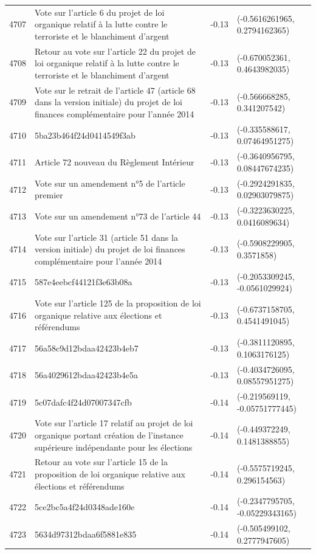 \begin{table}[ht]
\begin{tabular}{rlrl}
  4707 & Vote sur l'article 6 du projet de loi organique relatif à la lutte contre le terroriste et le blanchiment d'argent & -0.13 & (-0.5616261965, 0.2794162365) \\ 
  4708 & Retour au vote sur l'article 22 du projet de loi organique relatif à la lutte contre le terroriste et le blanchiment d'argent & -0.13 & (-0.670052361, 0.4643982035) \\ 
  4709 & Vote sur le retrait de l'article 47 (article 68 dans la version initiale) du projet de loi finances complémentaire pour l'année 2014 & -0.13 & (-0.566668285, 0.341207542) \\ 
  4710 & 5ba23b464f24d0414549f3ab & -0.13 & (-0.335588617, 0.07464951275) \\ 
  4711 & Article 72 nouveau du Règlement Intérieur & -0.13 & (-0.3640956795, 0.08447674235) \\ 
  4712 & Vote sur un amendement n°5 de l'article premier & -0.13 & (-0.2924291835, 0.02903079875) \\ 
  4713 & Vote sur un amendement n°73 de l'article 44 & -0.13 & (-0.3223630225, 0.0416089634) \\ 
  4714 & Vote sur l'article 31 (article 51 dans la version initiale) du projet de loi finances complémentaire pour l'année 2014 & -0.13 & (-0.5908229905, 0.3571858) \\ 
  4715 & 587e4eebcf44121f3e63b08a & -0.13 & (-0.2053309245, -0.0561029924) \\ 
  4716 & Vote sur l'article 125 de la proposition de loi organique relative aux élections et référendums & -0.13 & (-0.6737158705, 0.4541491045) \\ 
  4717 & 56a58c9d12bdaa42423b4eb7 & -0.13 & (-0.3811120895, 0.1063176125) \\ 
  4718 & 56a4029612bdaa42423b4e5a & -0.13 & (-0.4034726095, 0.08557951275) \\ 
  4719 & 5c07dafc4f24d07007347cfb & -0.14 & (-0.219569119, -0.05751777445) \\ 
  4720 & Vote sur l'article 17 relatif au projet de loi organique portant création de l'instance supérieure indépendante pour les élections & -0.14 & (-0.449372249, 0.1481388855) \\ 
  4721 & Retour au vote sur l'article 15 de la proposition de loi organique relative aux élections et référendums & -0.14 & (-0.5575719245, 0.296154563) \\ 
  4722 & 5ce2bc5a4f24d0348ade160e & -0.14 & (-0.2347795705, -0.05229343165) \\ 
  4723 & 5634d97312bdaa6f5881e835 & -0.14 & (-0.505499102, 0.2777947605) \\ 

\end{tabular}
\end{table}
